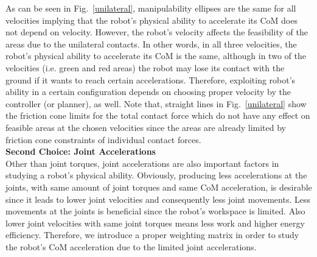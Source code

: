 As can be seen in Fig.~\ref{unilateral}, manipulability ellipses are the same
for all velocities implying that the robot's physical ability to accelerate
its CoM does not depend on velocity.  However, the robot's velocity affects
the feasibility of the areas due to the unilateral contacts.  In other words,
in all three velocities, the robot's physical ability to accelerate its CoM is
the same, although in two of the velocities (i.e. green and red areas) the
robot may lose its contact with the ground if it wants to reach certain
accelerations.  Therefore, exploiting robot's ability in a certain
configuration depends on choosing proper velocity by the controller (or
planner), as well.  Note that, straight lines in Fig.~\ref{unilateral} show
the friction cone limits for the total contact force which do not have any
effect on feasible areas at the chosen velocities since the areas are already
limited by friction cone constraints of individual contact forces.\\


\textbf{Second Choice: Joint Accelerations}\\

Other than joint torques, joint accelerations are also important factors in
studying a robot's physical ability.  Obviously, producing less accelerations
at the joints, with same amount of joint torques and same CoM acceleration, is
desirable since it leads to lower joint velocities and consequently less joint
movements.  Less movements at the joints is beneficial since the robot's
workspace is limited.  Also lower joint velocities with same joint torques
means less work and higher energy efficiency.  Therefore, we introduce a
proper weighting matrix in order to study the robot's CoM acceleration due to
the limited joint accelerations.

